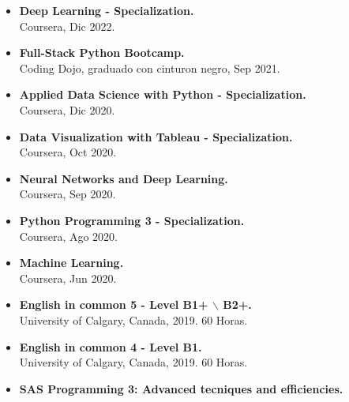 \documentclass[10pt, a4paper, ragged2e, withhyper, spanish]{altacv}
\begin{document}
\begin{paracol}{2}
\begin{itemize}
	\item \textbf{Deep Learning - Specialization.} \\
	Coursera, Dic 2022.
	\item \textbf{Full-Stack Python Bootcamp.} \\
	Coding Dojo, graduado con cinturon negro, Sep 2021.
	\item \textbf{Applied Data Science with Python - Specialization.} \\
	Coursera, Dic 2020.
	\item \textbf{Data Visualization with Tableau - Specialization.}\\
	Coursera, Oct 2020.	
	\item \textbf{Neural Networks and Deep Learning.}\\
	Coursera, Sep 2020.
	\item \textbf{Python Programming 3 - Specialization.}\\
	Coursera, Ago 2020. %
	\item \textbf{Machine Learning.}\\ 
	Coursera, Jun 2020. %
	\item \textbf{English in common 5 - Level B1+ $\backslash$ B2+.} \\
	University of Calgary, Canada, 2019. 60 Horas.
	\item \textbf{English in common 4 - Level B1.} \\
	University of Calgary, Canada, 2019. 60 Horas.
	\item \textbf{SAS Programming 3: Advanced tecniques and efficiencies.}\\ 

\end{itemize}
\end{paracol}
\end{document}

